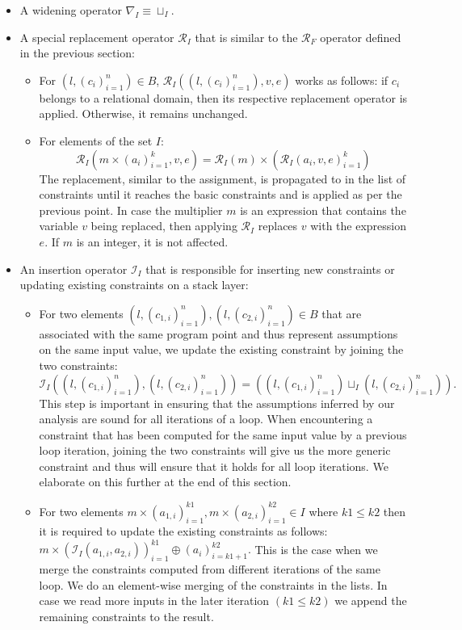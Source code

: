 \documentclass[10pt]{report}
\begin{document}
\begin{itemize}
	\item A widening operator $ \nabla_{I} \equiv \sqcup_{I} .$
	\item A special replacement operator $ \mathcal{R}_{I} $ that is similar to the $ \mathcal{R}_{F} $ operator defined in the previous section:
	\begin{itemize}
		\item For $ (l, (c_{i})_{i=1}^{n}) \in B$, $ \mathcal{R}_{I}((l, (c_{i})_{i=1}^{n}), v, e) $ works as follows: if $ c_{i} $ belongs to a relational domain, then its respective replacement operator is applied. Otherwise, it remains unchanged.  
		\item For elements of the set $ I $: $$ \mathcal{R}_{I}(m \times (a_{i})_{i=1}^{k}, v, e) = \mathcal{R}_{I}(m) \times (\mathcal{R}_{I}(a_{i}, v, e)_{i=1}^{k}) $$ The replacement, similar to the assignment, is propagated to in the list of constraints until it reaches the basic constraints and is applied as per the previous point. In case the multiplier $ m $ is an expression that contains the variable $ v $ being replaced, then applying $ \mathcal{R}_{I} $ replaces $ v $ with the expression $ e $. If $ m $ is an integer, it is not affected.  
	\end{itemize}
	\item An insertion operator $ \mathcal{I}_{I} $ that is responsible for inserting new constraints or updating existing constraints on a stack layer:
	\begin{itemize}
		\item For two elements $ (l, (c_{1,i})_{i=1}^{n}), (l, (c_{2,i})_{i=1}^{n} ) \in B $ that are associated with the same program point and thus represent assumptions on the same input value, we update the existing constraint by joining the two constraints: $ \mathcal{I}_{I}((l, (c_{1,i})_{i=1}^{n}), (l, (c_{2,i})_{i=1}^{n})) = ((l, (c_{1,i})_{i=1}^{n}) \sqcup_{I} (l, (c_{2,i})_{i=1}^{n})).$ This step is important in ensuring that the assumptions inferred by our analysis are sound for all iterations of a loop. When encountering  a constraint that has been computed for the same input value by a previous loop iteration, joining the two constraints will give us the more generic constraint and thus will ensure that it holds for all loop iterations. We elaborate on this further at the end of this section. 
		\item For two elements $ m \times (a_{1,i})_{i=1}^{k1}, m \times (a_{2,i})_{i=1}^{k2} \in I $ where $ k1 \leq k2 $ then it is required to update the existing constraints as follows: $ m \times (\mathcal{I}_{I}(a_{1,i}, a_{2,i}))_{i=1}^{k1} \oplus (a_{i})_{i=k1+1}^{k2}.$ This is the case when we merge the constraints computed from different iterations of the same loop. We do an element-wise merging of the constraints in the lists. In case we read more inputs in the later iteration $ (k1 \leq k2) $ we append the remaining constraints to the result. 
		

\end{itemize}
\end{itemize}
\end{document}
